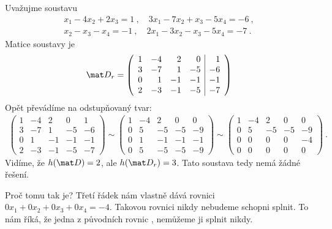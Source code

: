 \begin{example}
    Uvažujme soustavu 
    \begin{align}
        x_1 - 4 x_2 + 2x_3 = 1 \:, \quad 3 x_1 - 7 x_2 + x_3 - 5 x_4 = -6 \:, \\
        x_2 - x_3 - x_4 = -1 \:, \quad 2 x_1 - 3 x_2 - x_3 - 5 x_4 = -7 \:.
    \end{align}
    Matice soustavy je
    \begin{align}
        \mat D_r = \left( \begin{array}{rrrr|r}
            1 & -4 & 2 & 0 & 1 \\ 3 & -7 & 1 & -5 & -6 \\ 0 & 1& -1 & -1 & -1 \\ 2 & -3 & -1 & -5 & -7 
        \end{array}\right)
    \end{align}
    Opět převádíme na odstupňovaný tvar:
    \begin{align}
        \left( \begin{array}{rrrr|r}
            1 & -4 & 2 & 0 & 1 \\ 3 & -7 & 1 & -5 & -6 \\ 0 & 1& -1 & -1 & -1 \\ 2 & -3 & -1 & -5 & -7 
        \end{array}\right)
        \sim
        \left( \begin{array}{rrrr|r}
            1 & -4 & 2 & 0 & 0 \\ 0 & 5 & -5 & -5 & -9 \\ 0 & 1& -1 & -1 & -1 \\ 0 & 5 & -5 & -5 & -9 
        \end{array}\right)
        \sim
        \left( \begin{array}{rrrr|r}
            1 & -4 & 2 & 0 & 0 \\ 0 & 5 & -5 & -5 & -9 \\ 0 & 0 & 0 & 0 & -4 \\ 0 & 0 & 0 & 0 & 0
        \end{array}\right) \:.
    \end{align}
    Vidíme, že $h(\mat D) = 2$, ale $h(\mat D_r) = 3$. Tato soustava tedy nemá žádné řešení.

    Proč tomu tak je? Třetí řádek nám vlastně dává rovnici $0x_1 + 0x_2 + 0x_3 + 0x_4 = -4$. Takovou rovnici nikdy nebudeme schopni splnit. To nám říká, že jedna z původních rovnic , nemůžeme ji splnit nikdy.
\end{example}

